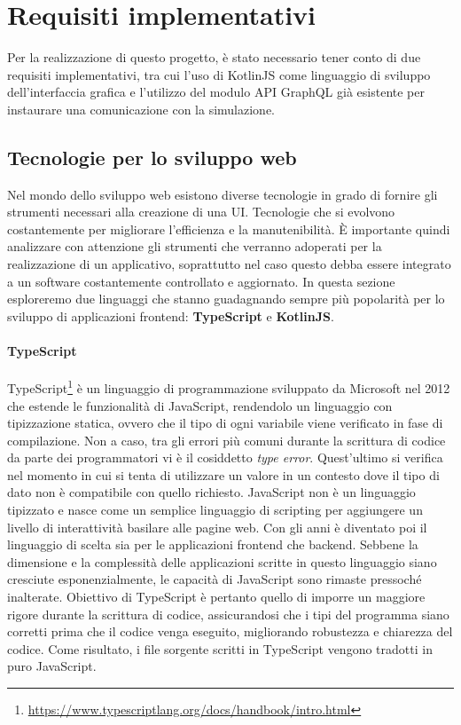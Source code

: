 \section{Requisiti implementativi}
Per la realizzazione di questo progetto, è stato necessario tener conto di due requisiti implementativi, tra cui l'uso di KotlinJS come linguaggio di sviluppo dell'interfaccia grafica e l'utilizzo del modulo API GraphQL già esistente per instaurare una comunicazione con la simulazione. 
\subsection{Tecnologie per lo sviluppo web}
Nel mondo dello sviluppo web esistono diverse tecnologie in grado di fornire gli strumenti necessari alla creazione di una \ac{UI}. Tecnologie che si evolvono costantemente per migliorare l'efficienza e la manutenibilità. È importante quindi analizzare con attenzione gli strumenti che verranno adoperati per la realizzazione di un applicativo, soprattutto nel caso questo debba essere integrato a un software costantemente controllato e aggiornato. In questa sezione esploreremo due linguaggi che stanno guadagnando sempre più popolarità per lo sviluppo di applicazioni frontend: \textbf{TypeScript} e \textbf{KotlinJS}.
\paragraph{TypeScript}
TypeScript\footnote{\url{https://www.typescriptlang.org/docs/handbook/intro.html}} è un linguaggio di programmazione sviluppato da Microsoft nel 2012 che estende le funzionalità di JavaScript, rendendolo un linguaggio con tipizzazione statica, ovvero che il tipo di ogni variabile viene verificato in fase di compilazione. Non a caso, tra gli errori più comuni durante la scrittura di codice da parte dei programmatori vi è il cosiddetto \textit{type error}. Quest'ultimo si verifica nel momento in cui si tenta di utilizzare un valore in un contesto dove il tipo di dato non è compatibile con quello richiesto. 
JavaScript non è un linguaggio tipizzato e nasce come un semplice linguaggio di scripting per aggiungere un livello di interattività basilare alle pagine web. Con gli anni è diventato poi il linguaggio di scelta sia per  le applicazioni frontend che backend. Sebbene la dimensione e la complessità delle applicazioni scritte in questo linguaggio siano cresciute esponenzialmente, le capacità di JavaScript sono rimaste pressoché inalterate. Obiettivo di TypeScript è pertanto quello di imporre un maggiore rigore durante la scrittura di codice, assicurandosi che i tipi del programma siano corretti prima che il codice venga eseguito, migliorando robustezza e chiarezza del codice. Come risultato, i file sorgente scritti in TypeScript vengono tradotti in puro JavaScript.
